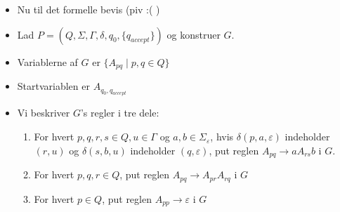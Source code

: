 \begin{frame}[allowframebreaks]
\begin{itemize}
		\item Nu til det formelle bevis (piv :( )
		\item Lad $P = (Q, \Sigma, \Gamma, \delta, q_{0}, \{q_{accept}\})$ og konstruer $G$.
		\item Variablerne af $G$ er $\{A_{pq} \mid p,q \in Q\}$
		\item Startvariablen er $A_{q_{0}, q_{accept}}$
		\item Vi beskriver $G$'s regler i tre dele:
		      \begin{enumerate}
			      \item For hvert $p,q,r,s \in Q, u \in \Gamma$ og $a,b \in \Sigma_{\varepsilon}$, hvis $\delta(p,a,\varepsilon)$ indeholder $(r,u)$ og $\delta(s,b,u)$ indeholder $(q, \varepsilon)$, put reglen $A_{pq} \rightarrow aA_{rs}b$ i $G$.
			      \item For hvert $p,q,r \in Q$, put reglen $A_{pq} \rightarrow A_{pr}A_{rq}$ i $G$
			      \item For hvert $p \in Q$, put reglen $A_{pp} \rightarrow \varepsilon$ i $G$
		      \end{enumerate}


\end{itemize}
\end{frame}
